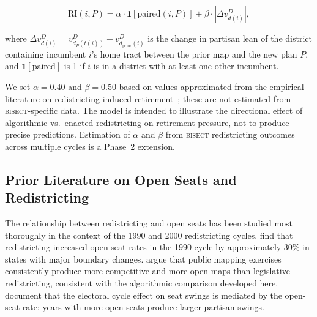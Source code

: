 \[
  \text{RI}(i, P) = \alpha \cdot \mathbf{1}[\text{paired}(i,P)]
  + \beta \cdot |\Delta v^D_{d(i)}|,
\]

where $\Delta v^D_{d(i)} = v^D_{d_P(t(i))} - v^D_{d_\text{prior}(i)}$ is the change
in partisan lean of the district containing incumbent $i$'s home tract between the
prior map and the new plan $P$, and $\mathbf{1}[\text{paired}]$ is 1 if $i$ is in a
district with at least one other incumbent.

We set $\alpha = 0.40$ and $\beta = 0.50$ based on values approximated from the
empirical literature on redistricting-induced retirement~\citep{ansolabehere2000incumbency};
these are not estimated from \textsc{bisect}-specific data.
The model is intended to illustrate the directional effect of algorithmic vs.\ enacted
redistricting on retirement pressure, not to produce precise predictions.
Estimation of $\alpha$ and $\beta$ from \textsc{bisect} redistricting outcomes across
multiple cycles is a Phase~2 extension.

\subsection{Prior Literature on Open Seats and Redistricting}

The relationship between redistricting and open seats has been studied most thoroughly
in the context of the 1990 and 2000 redistricting cycles. \citet{ansolabehere2000incumbency}
find that redistricting increased open-seat rates in the 1990 cycle by approximately
30\% in states with major boundary changes. \citet{altman2011public} argue that public
mapping exercises consistently produce more competitive and more open maps than
legislative redistricting, consistent with the algorithmic comparison developed here.
\citet{king1994electoral} document that the electoral cycle effect on seat swings is
mediated by the open-seat rate: years with more open seats produce larger partisan swings.
